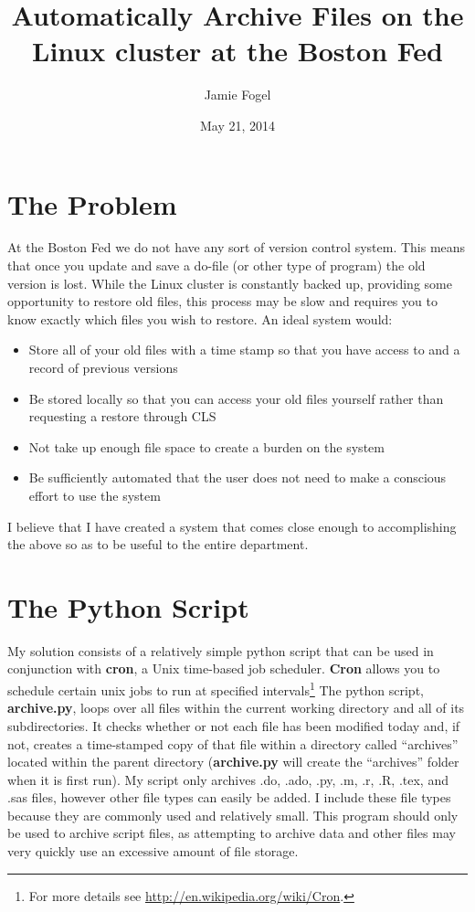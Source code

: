 \documentclass[11pt]{article}
\title{Automatically Archive Files on the Linux cluster at the Boston Fed}
\author{Jamie Fogel}
\date{May 21, 2014}
\begin{document}
\maketitle

\section{The Problem}

At the Boston Fed we do not have any sort of version control system. This means that once you update and save a do-file (or other type of program) the old version is lost. While the Linux cluster is constantly backed up, providing some opportunity to restore old files, this process may be slow and requires you to know exactly which files you wish to restore. An ideal system would:
\begin{itemize}
  \item Store all of your old files with a time stamp so that you have access to and a record of previous versions
  \item Be stored locally so that you can access your old files yourself rather than requesting a restore through CLS
  \item Not take up enough file space to create a burden on the system
  \item Be sufficiently automated that the user does not need to make a conscious effort to use the system
\end{itemize}
I believe that I have created a system that comes close enough to accomplishing the above so as to be useful to the entire department.

\section{The Python Script}

My solution consists of a relatively simple python script that can be used in conjunction with \textbf{cron}, a Unix time-based job scheduler. \textbf{Cron} allows you to schedule certain unix jobs to run at specified intervals\footnote{For more details see \url{http://en.wikipedia.org/wiki/Cron}.} The python script, \textbf{archive.py}, loops over all files within the current working directory and all of its subdirectories. It checks whether or not each file has been modified today and, if not, creates a time-stamped copy of that file within a directory called ``archives'' located within the parent directory (\textbf{archive.py} will create the ``archives'' folder when it is first run).  My script only archives .do, .ado, .py, .m, .r, .R, .tex, and .sas files, however other file types can easily be added. I include these file types because they are commonly used and relatively small. This program should only be used to archive script files, as attempting to archive data and other files may very quickly use an excessive amount of file storage.
\end{document}
